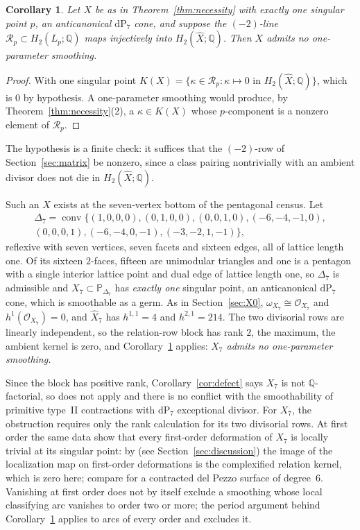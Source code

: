 \documentclass[11pt]{amsart}
\newtheorem{corollary}[theorem]{Corollary}
\theoremstyle{definition}
\theoremstyle{remark}
\theoremstyle{plain}
\newcommand{\QQ}{\mathbb{Q}}
\newcommand{\PP}{\mathbb{P}}
\newcommand{\cO}{\mathcal{O}}
\newcommand{\Rsm}{\mathcal{R}}   %
\newcommand{\conv}{\operatorname{conv}}
\newcommand{\dP}{\mathrm{dP}}
\newcommand{\Xh}{\widehat{X}}
\begin{document}
\begin{corollary}\label{cor:onegerm}
Let $X$ be as in Theorem~\ref{thm:necessity} with exactly one singular
point $p$, an anticanonical $\dP_7$ cone, and suppose the $(-2)$-line
$\Rsm_p\subset H_2(L_p;\QQ)$ maps injectively into $H_2(\Xh;\QQ)$.  Then
$X$ admits no one-parameter smoothing.
\end{corollary}

\begin{proof}
With one singular point $K(X)=\{\kappa\in \Rsm_p:\kappa\mapsto0$ in
$H_2(\Xh;\QQ)\}$, which is $0$ by hypothesis.  A one-parameter smoothing
would produce, by Theorem~\ref{thm:necessity}(2), a
$\kappa\in K(X)$ whose $p$-component is a nonzero element of $\Rsm_p$.
\end{proof}

The hypothesis is a finite check: it suffices that the $(-2)$-row of
Section~\ref{sec:matrix} be nonzero, since a class pairing nontrivially
with an ambient divisor does not die in $H_2(\Xh;\QQ)$.

Such an $X$ exists at the seven-vertex bottom of the pentagonal census.  Let
\[
\begin{gathered}
\Delta_7=\conv\{(1,0,0,0),(0,1,0,0),(0,0,1,0),(-6,-4,-1,0),\\
(0,0,0,1),(-6,-4,0,-1),(-3,-2,1,-1)\},
\end{gathered}
\]
reflexive with seven vertices, seven facets and sixteen edges, all of
lattice length one.  Of its sixteen $2$-faces, fifteen are unimodular
triangles and one is a pentagon with a single interior lattice point and
dual edge of lattice length one, so $\Delta_7$ is admissible and
$X_7\subset\PP_{\Delta_7}$ has \emph{exactly one} singular point, an
anticanonical $\dP_7$ cone, which is smoothable as a germ.  As in
Section~\ref{sec:X0}, $\omega_{X_7}\cong\cO_{X_7}$ and
$h^1(\cO_{X_7})=0$, and $\Xh_7$ has $h^{1,1}=4$ and $h^{2,1}=214$.  The
two divisorial rows are linearly independent, so the relation-row block has
rank $2$, the maximum, the ambient kernel is zero, and
Corollary~\ref{cor:onegerm} applies: \emph{$X_7$ admits no one-parameter
smoothing.}

Since the block has positive rank,
Corollary~\ref{cor:defect} says $X_7$ is not $\QQ$-factorial, so
\cite[Theorem~5.8]{Gross97} does not apply and there is
no conflict with the smoothability of primitive type~II contractions
with $\dP_7$ exceptional divisor.  For $X_7$, the obstruction requires only
the rank calculation for its two divisorial rows.  At first order the same
data show that every first-order deformation of $X_7$ is locally trivial at
its singular point: by \cite{PaperV} (see Section~\ref{sec:discussion}) the
image of the localization map on first-order deformations is the
complexified relation kernel, which is zero here; compare
\cite[Theorem~10]{Namikawa97} for a contracted del Pezzo surface of
degree~$6$.  Vanishing at first order does not by itself exclude a
smoothing whose local classifying arc vanishes to order two or more; the
period argument behind Corollary~\ref{cor:onegerm} applies to arcs of every
order and excludes it.
\end{document}
